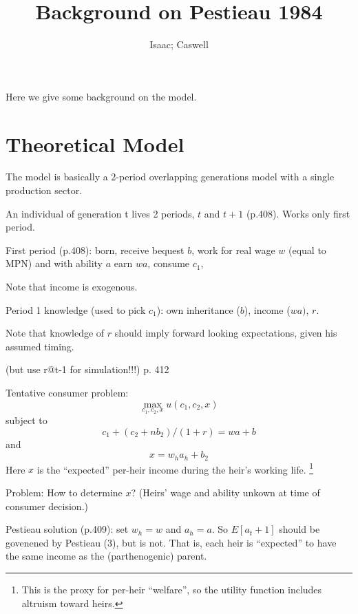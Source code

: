 \documentclass{article}
\begin{document}
\author{Isaac; Caswell}
\title{Background on Pestieau 1984}
\maketitle

Here we give some background on the \citet{pestieau-1984-oep} model.


\section{Theoretical Model}

The model is basically a 2-period overlapping generations model with a single production sector.

An individual of generation t lives 2 periods, $t$ and $t+1$ (p.408).
Works only first period.

First period (p.408):
born,
receive bequest $b$,
work for real wage $w$ (equal to MPN) and with ability $a$ earn $wa$,
consume $c_{1}$,

Note that income is exogenous.

Period 1 knowledge (used to pick $c_{1}$):
own inheritance ($b$),
income ($wa)$, $r$.

Note that knowledge of $r$ should imply forward looking expectations,
given his assumed timing.

(but use r@t-1 for simulation!!!) p. 412

Tentative consumer problem:
\begin{equation}
\max_{c_{1},c_{2},x} u(c_{1}, c_{2}, x)
\end{equation}
subject to
\begin{equation}
c_{1} + (c_{2} + n b_{2})/(1+r) = w a + b
\end{equation}
and
\begin{equation}
x = w_{h}a_{h}+ b_{2}
\end{equation}
Here $x$ is the ``expected'' per-heir income during the heir's working life.%
\footnote{%
This is the proxy for per-heir ``welfare'',
so the utility function includes altruism toward heirs.
} %
%


Problem: How to determine $x$?
(Heirs' wage and ability unkown at time of consumer decision.)

Pestieau solution (p.409): set $w_{h}=w$ and $a_{h}=a$.
So $E[a_t+1]$ should be govenened by Pestieau (3), but is not.
That is, each heir is ``expected'' to have the same income as the (parthenogenic) parent.
\end{document}
